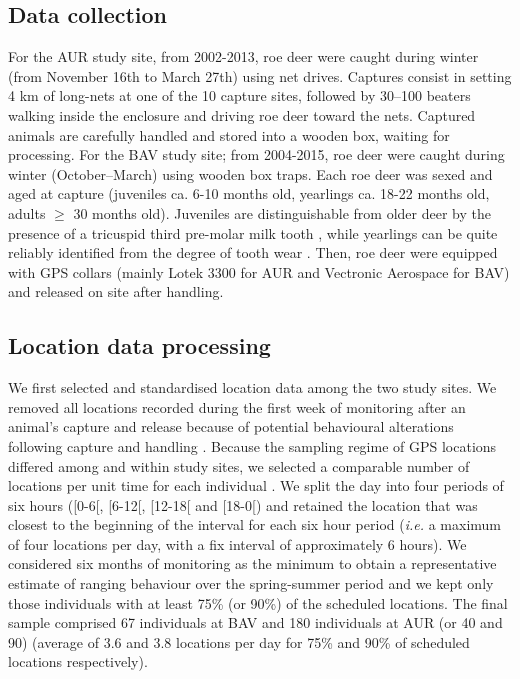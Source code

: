 \documentclass[a4paper,11pt]{article}
\begin{document}
\subsection*{Data collection}
For the AUR study site, from 2002-2013, roe deer were caught during
winter (from November 16th to March 27th) using net drives. Captures
consist in setting 4 km of long-nets at one of the 10 capture sites,
followed by 30--100 beaters walking inside the enclosure and driving
roe deer toward the nets. Captured animals are carefully handled and
stored into a wooden box, waiting for processing. For the BAV study
site; from 2004-2015, roe deer were caught during winter
(October–March) using wooden box traps. Each roe deer was sexed and aged at
capture (juveniles ca. 6-10 months old, yearlings ca. 18-22 months
old, adults $\geq$ 30 months old). Juveniles are distinguishable from
older deer by the presence of a tricuspid third pre-molar milk tooth
\citep{ratcliffe_roe_1992}, while yearlings can be quite reliably
identified from the degree of tooth wear
\citep{hewison_tests_1999}. Then, roe deer were equipped with GPS
collars (mainly Lotek 3300 for AUR and Vectronic Aerospace for BAV)
and released on site after handling.

\subsection*{Location data processing}
We first selected and standardised location data among the two study
sites. We removed all locations recorded during the first week of
monitoring after an animal’s capture and release because of potential
behavioural alterations following capture and handling
\citep{morellet_effect_2009}. Because the sampling regime of GPS
locations differed among and within study sites, we selected a
comparable number of locations per unit time for each individual
\citep{morellet_seasonality_2013}. We split the day into four periods
of six hours ([0-6[, [6-12[, [12-18[ and [18-0[) and retained the
location that was closest to the beginning of the interval for each
six hour period (\textit{i.e.} a maximum of four locations per day,
with a fix interval of approximately 6 hours). We considered six
months of monitoring as the minimum to obtain a representative
estimate of ranging behaviour over the spring-summer period and we
kept only those individuals with at least 75\% (or 90\%) of the
scheduled locations. The final sample comprised 67 individuals at BAV
and 180 individuals at AUR (or 40 and 90) (average of 3.6 and 3.8
locations per day for 75\% and 90\% of scheduled locations
respectively).
\end{document}
